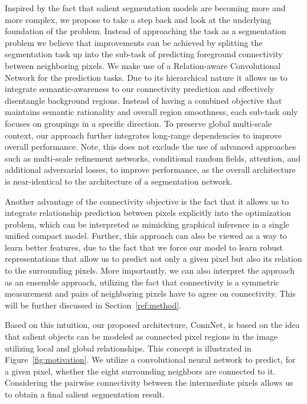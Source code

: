 \documentclass[journal]{IEEEtran}
\begin{document}
Inspired by the fact that salient segmentation models are becoming more and more complex, we propose to take a step back and look at the underlying foundation of the problem. Instead of approaching the task as a segmentation problem we believe that improvements can be achieved by splitting the segmentation task up into the sub-task of predicting foreground connectivity between neighboring pixels. We make use of a Relation-aware Convolutional Network for the prediction tasks. Due to its hierarchical nature it allows us to integrate semantic-awareness to our connectivity prediction and effectively disentangle background regions. Instead of having a combined objective that maintains semantic rationality and overall region smoothness, each sub-task only focuses on groupings in a specific direction. To preserve global multi-scale context, our approach further integrates long-range dependencies to improve overall performance.
Note, this does not exclude the use of advanced approaches such as multi-scale refinement networks, conditional random fields, attention, and additional adversarial losses, to improve performance, as the overall architecture is near-identical to the architecture of a segmentation network.

Another advantage of the connectivity objective is the fact that it allows us to integrate relationship prediction between pixels explicitly into the optimization problem, which can be interpreted as mimicking graphical inference in a single unified compact model.
Further, this approach can also be viewed as a way to learn better features, due to the fact that we force our model to learn robust representations that allow us to predict not only a given pixel but also its relation to the surrounding pixels.
More importantly, we can also interpret the approach as an ensemble approach, utilizing the fact that connectivity is a symmetric measurement and pairs of neighboring pixels have to agree on connectivity. This will be further discussed in Section~\ref{ref:method}. 

Based on this intuition, our proposed architecture, ConnNet, is based on the idea that salient objects can be modeled as connected pixel regions in the image utilizing local and global relationships. This concept is illustrated in Figure~\ref{fig:motivation}. We utilize a convolutional neural network to predict, for a given pixel, whether the eight surrounding neighbors are connected to it. Considering the pairwise connectivity between the intermediate pixels allows us to obtain a final salient segmentation result.
\end{document}
